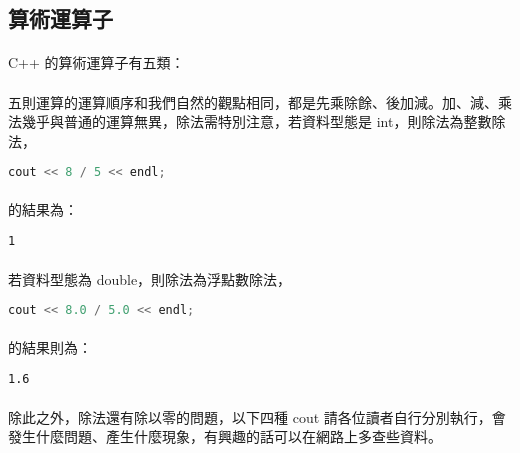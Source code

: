 \documentclass[12pt,a4paper,oneside]{book}
\begin{document}
\begin{CJK}{UTF8}{bkai}
\section{算術運算子}

\paragraph{}C++ 的算術運算子有五類：
\paragraph{}五則運算的運算順序和我們自然的觀點相同，都是先乘除餘、後加減。加、減、乘法幾乎與普通的運算無異，除法需特別注意，若資料型態是 int，則除法為整數除法，
\begin{lstlisting}[language=C++]
cout << 8 / 5 << endl;
\end{lstlisting}
\paragraph{}的結果為：
\begin{lstlisting}
1
\end{lstlisting}
\paragraph{}若資料型態為 double，則除法為浮點數除法，
\begin{lstlisting}[language=C++]
cout << 8.0 / 5.0 << endl;
\end{lstlisting}
\paragraph{}的結果則為：
\begin{lstlisting}
1.6
\end{lstlisting}
\paragraph{}除此之外，除法還有除以零的問題，以下四種 cout 請各位讀者自行分別執行，會發生什麼問題、產生什麼現象，有興趣的話可以在網路上多查些資料。
\end{CJK}
\end{document}
